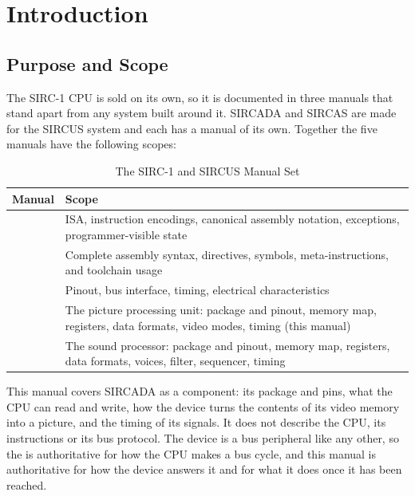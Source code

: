 \chapter{Introduction}
\label{ch:introduction}

\section{Purpose and Scope}

The SIRC-1 CPU is sold on its own, so it is documented in three manuals that stand apart from any system built around
it. SIRCADA and SIRCAS are made for the SIRCUS system and each has a manual of its own. Together the five manuals have
the following scopes:

\begin{table}[H]
	\centering
	\begin{tabular}{lp{8.2cm}}
		\toprule
		\textbf{Manual} & \textbf{Scope}                                                                                                          \\
		\midrule
		\archmanual{}   & ISA, instruction encodings, canonical assembly notation, exceptions, programmer-visible state                           \\
		\asmmanual{}    & Complete assembly syntax, directives, symbols, meta-instructions, and toolchain usage                                   \\
		\hwmanual{}     & Pinout, bus interface, timing, electrical characteristics                                                               \\
		\videomanual{}  & The picture processing unit: package and pinout, memory map, registers, data formats, video modes, timing (this manual) \\
		\audiomanual{}  & The sound processor: package and pinout, memory map, registers, data formats, voices, filter, sequencer, timing         \\
		\bottomrule
	\end{tabular}
	\caption{The SIRC-1 and SIRCUS Manual Set}
	\label{tab:manual-set}
\end{table}

This manual covers SIRCADA as a component: its package and pins, what the CPU can read and write, how the device turns
the contents of its video memory into a picture, and the timing of its signals. It does not describe the CPU, its
instructions or its bus protocol. The device is a bus peripheral like any other, so the \hwmanual{} is authoritative
for how the CPU makes a bus cycle, and this manual is authoritative for how the device answers it and for what it does
once it has been reached.

